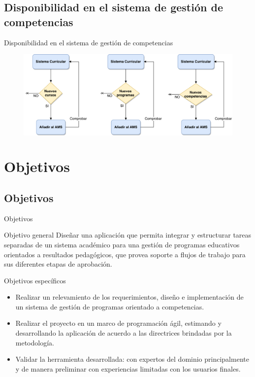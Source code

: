 \documentclass[10pt,xcolor=table ]{beamer}
\begin{document}
\subsection{Disponibilidad en el sistema de gestión de competencias}
\begin{frame}{Disponibilidad en el sistema de gestión de competencias}
	\begin{figure}
		\centering
	    \includegraphics[scale=0.35]{../Figuras/after_creation}
	\end{figure}
\end{frame}

\section{Objetivos}
\subsection{Objetivos}
\begin{frame}[t]{Objetivos}
	\begin{alertblock}{Objetivo general}
        Diseñar una aplicación que permita integrar y estructurar tareas separadas de un sistema académico para una gestión de programas educativos orientados a resultados pedagógicos, que provea soporte a flujos de trabajo para sus diferentes etapas de aprobación.
      \end{alertblock}

	\begin{alertblock}{Objetivos específicos}
        \begin{itemize}
        	\item Realizar un relevamiento de los requerimientos, diseño e implementación de un sistema de gestión de programas orientado a competencias.
        	\item Realizar el proyecto en un marco de programación ágil, estimando y desarrollando la aplicación de acuerdo a las directrices brindadas por la metodología.
        	\item Validar la herramienta desarrollada: con expertos del dominio principalmente y de manera preliminar con experiencias limitadas con los usuarios finales.
        \end{itemize}
    \end{alertblock}
\end{frame}
\end{document}
